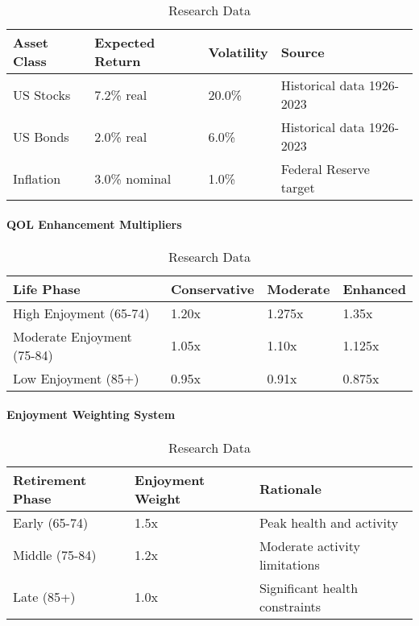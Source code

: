 \documentclass[11pt,letterpaper]{article}
\begin{document}
\begin{table}[H]
\centering
\begin{tabular}{@{}llll@{}}
\toprule
\textbf{Asset Class} & \textbf{Expected Return} & \textbf{Volatility} & \textbf{Source} \\
\midrule
US Stocks & 7.2\% real & 20.0\% & Historical data 1926-2023 \\
US Bonds & 2.0\% real & 6.0\% & Historical data 1926-2023 \\
Inflation & 3.0\% nominal & 1.0\% & Federal Reserve target \\
\bottomrule
\end{tabular}
\caption{Research Data}
\end{table}


\paragraph{QOL Enhancement Multipliers}

\begin{table}[H]
\centering
\begin{tabular}{@{}llll@{}}
\toprule
\textbf{Life Phase} & \textbf{Conservative} & \textbf{Moderate} & \textbf{Enhanced} \\
\midrule
High Enjoyment (65-74) & 1.20x & 1.275x & 1.35x \\
Moderate Enjoyment (75-84) & 1.05x & 1.10x & 1.125x \\
Low Enjoyment (85+) & 0.95x & 0.91x & 0.875x \\
\bottomrule
\end{tabular}
\caption{Research Data}
\end{table}


\paragraph{Enjoyment Weighting System}

\begin{table}[H]
\centering
\begin{tabular}{@{}lll@{}}
\toprule
\textbf{Retirement Phase} & \textbf{Enjoyment Weight} & \textbf{Rationale} \\
\midrule
Early (65-74) & 1.5x & Peak health and activity \\
Middle (75-84) & 1.2x & Moderate activity limitations \\
Late (85+) & 1.0x & Significant health constraints \\
\bottomrule
\end{tabular}
\caption{Research Data}
\end{table}
\end{document}
